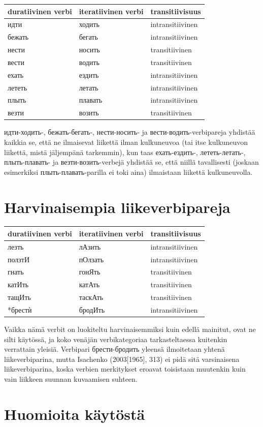 \documentclass[]{scrreprt}
\begin{document}
\begin{longtable}[c]{@{}lll@{}}
\toprule
duratiivinen verbi & iteratiivinen verbi &
transitiivisuus\tabularnewline
\midrule
\endhead
идти & ходить & intransitiivinen\tabularnewline
бежать & бегать & intransitiivinen\tabularnewline
нести & носить & transitiivinen\tabularnewline
вести & водить & transitiivinen\tabularnewline
ехать & ездить & intransitiivinen\tabularnewline
лететь & летать & intransitiivinen\tabularnewline
плыть & плавать & intransitiivinen\tabularnewline
везти & возить & transitiivinen\tabularnewline
\bottomrule
\end{longtable}

идти-ходить-, бежать-бегать-, нести-носить- ja вести-водить-verbipareja
yhdistää kaikkia se, että ne ilmaisevat liikettä ilman kulkuneuvoa (tai
itse kulkuneuvon liikettä, mistä jäljempänä tarkemmin), kun taas
ехать-ездить-, лететь-летать-, плыть-плавать- ja везти-возить-verbejä
yhdistää se, että niillä tavallisesti (joskaan esimerkiksi
плыть-плавать-parilla ei toki aina) ilmaistaan liikettä kulkuneuvolla.

\section{Harvinaisempia
liikeverbipareja}\label{harvinaisempia-liikeverbipareja}

\begin{longtable}[c]{@{}lll@{}}
\toprule
duratiivinen verbi & iteratiivinen verbi &
transitiivisuus\tabularnewline
\midrule
\endhead
лезть & лАзить & intransitiivinen\tabularnewline
ползтИ & пОлзать & intransitiivinen\tabularnewline
гнать & гонЯть & transitiivinen\tabularnewline
катИть & катАть & transitiivinen\tabularnewline
тащИть & таскАть & transitiivinen\tabularnewline
*брестѝ & бродИть & intransitiivinen\tabularnewline
\bottomrule
\end{longtable}

Vaikka nämä verbit on luokiteltu harvinaisemmiksi kuin edellä mainitut,
ovat ne silti käytössä, ja koko venäjän verbikategoriaa tarkasteltaessa
kuitenkin verrattain yleisiä. Verbipari брести-бродить yleensä
ilmoitetaan yhtenä liikeverbiparina, mutta Isachenko (2003{[}1965{]},
313) ei pidä sitä varsinaisena liikeverbiparina, koska verbien
merkitykset eroavat toisistaan muutenkin kuin vain liikkeen suunnan
kuvaamisen suhteen.

\section{Huomioita käytöstä}\label{huomioita-kuxe4ytuxf6stuxe4}
\end{document}
